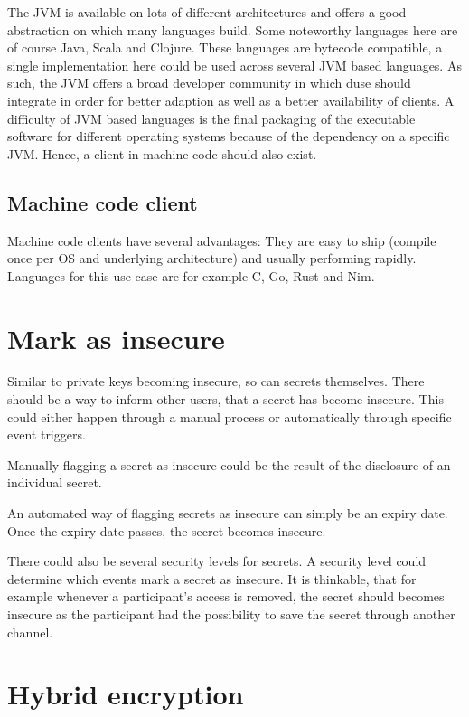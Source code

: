 The JVM is available on lots of different architectures and offers a good 
abstraction on which many languages build. Some noteworthy languages here are
of course Java, Scala and Clojure. These languages are bytecode compatible,
a single implementation here could be used across several JVM based languages.
As such, the JVM offers a broad developer community in which duse should
integrate in order for better adaption as well as a better availability of
clients. A difficulty of JVM based languages is the final packaging of the
executable software for different operating systems because of the dependency
on a specific JVM. Hence, a client in machine code should also exist.

\subsection{Machine code client}

Machine code clients have several advantages: They are easy to ship (compile
once per OS and underlying architecture) and usually performing rapidly.
Languages for this use case are for example C, Go, Rust and Nim.

\section{Mark as insecure}
\label{sec:mark_as_insecure}

Similar to private keys becoming insecure, so can secrets themselves. There
should be a way to inform other users, that a secret has become insecure. This
could either happen through a manual process or automatically through specific
event triggers.

Manually flagging a secret as insecure could be the result of the disclosure of
an individual secret.

An automated way of flagging secrets as insecure can simply be an expiry date.
Once the expiry date passes, the secret becomes insecure.

There could also be several security levels for secrets. A security level could
determine which events mark a secret as insecure. It is thinkable, that for
example whenever a participant's access is removed, the secret should becomes
insecure as the participant had the possibility to save the secret through
another channel.

\section{Hybrid encryption}

